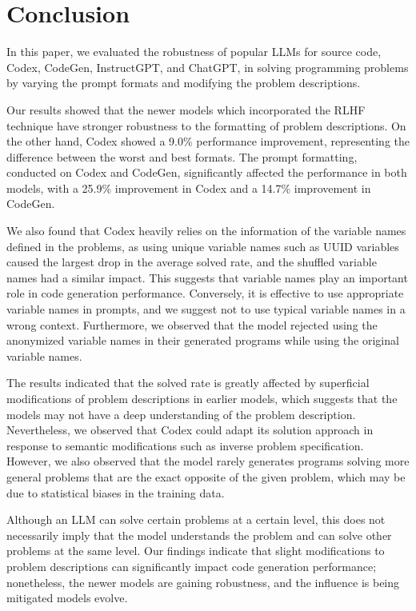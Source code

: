 \documentclass{article}
\begin{document}
\section{Conclusion}
\label{sec:conclusion}

In this paper, we evaluated the robustness of popular LLMs for source code, Codex, CodeGen, InstructGPT, and ChatGPT, in solving programming problems by varying the prompt formats and modifying the problem descriptions. 

Our results showed that the newer models which incorporated the RLHF technique have stronger robustness to the formatting of problem descriptions.
On the other hand, Codex showed a 9.0\% performance improvement, representing the difference between the worst and best formats.
The prompt formatting, conducted on Codex and CodeGen, significantly affected the performance in both models, with a 25.9\% improvement in Codex and a 14.7\% improvement in CodeGen.

We also found that Codex heavily relies on the information of the variable names defined in the problems, as using unique variable names such as UUID variables caused the largest drop in the average solved rate, and the shuffled variable names had a similar impact.
This suggests that variable names play an important role in code generation performance.
Conversely, it is effective to use appropriate variable names in prompts, and we suggest not to use typical variable names in a wrong context.
Furthermore, we observed that the model rejected using the anonymized variable names in their generated programs while using the original variable names.

The results indicated that the solved rate is greatly affected by superficial modifications of problem descriptions in earlier models, which suggests that the models may not have a deep understanding of the problem description.
Nevertheless, we observed that Codex could adapt its solution approach in response to semantic modifications such as inverse problem specification.
However, we also observed that the model rarely generates programs solving more general problems that are the exact opposite of the given problem, which may be due to statistical biases in the training data.

Although an LLM can solve certain problems at a certain level, this does not necessarily imply that the model understands the problem and can solve other problems at the same level.
Our findings indicate that slight modifications to problem descriptions can significantly impact code generation performance; nonetheless, the newer models are gaining robustness, and the influence is being mitigated models evolve.
\end{document}
